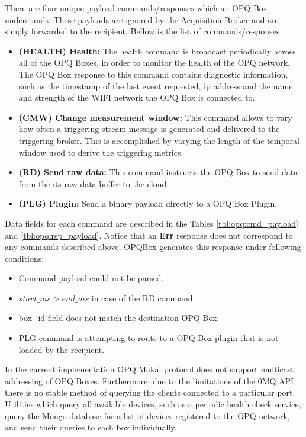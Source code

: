 There are four unique payload commands/responses which an OPQ Box understands.
These payloads are ignored by the Acquisition Broker and are simply forwarded to the recipient.
Bellow is the list of commands/responses:
\begin{itemize}
	\item{\textbf{(HEALTH) Health:}} The health command is broadcast periodically across all of the OPQ Boxes, in order to monitor the health of the OPQ network.
	The OPQ Box response to this command contains diagnostic information, such as the timestamp of the last event requested, ip address and the name and strength of the WIFI network the OPQ Box is connected to.
	\item{\textbf{(CMW) Change measurement window:}} This command allows to vary how often a triggering stream message is generated and delivered to the triggering broker.
	This is accomplished by varying the length of the temporal window used to derive the triggering metrics.
	\item{\textbf{(RD) Send raw data:}} This command instructs the OPQ Box to send data from the its raw data buffer to the cloud.
	\item {\textbf{(PLG) Plugin:}} Send a binary payload directly to a OPQ Box Plugin.
\end{itemize}
Data fields for each command are described in the Tables \ref{tbl:opq:cmd_payload} and \ref{tbl:opq:rsp_payload}.
Notice that an \textbf{Err} response does not correspond to any commands described above.
OPQBox generates this response under following conditions:
\begin{itemize}
	\item Command payload could not be parsed.
	\item $start\_ms > end\_ms$ in case of the RD command.
	\item box\_id field does not match the destination OPQ Box.
	\item PLG command is attempting to route to a OPQ Box plugin that is not loaded by the recipient.
\end{itemize}
In the current implementation OPQ Makai protocol does not support multicast addressing of OPQ Boxes.
Furthermore, due to the limitations of the 0MQ API, there is no stable method of querying the clients connected to a particular port.
Utilities which query all available devices, such as a periodic health check service, query the Mongo database for a list of devices registered to the OPQ network, and send their queries to each box individually.
